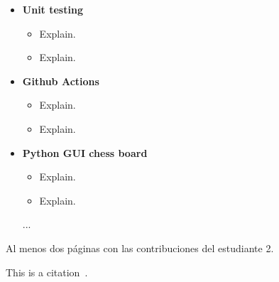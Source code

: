 \begin{itemize}
    \item \textbf{Unit testing}
    \begin{itemize}
        \item Explain.
        \item Explain.
    \end{itemize}
    
    \item \textbf{Github Actions}
    \begin{itemize}
        \item Explain.
        \item Explain.
    \end{itemize}

    \item \textbf{Python GUI chess board}
    \begin{itemize}
        \item Explain.
        \item Explain.
    \end{itemize}

    ...
\end{itemize}

Al menos dos páginas con las contribuciones del estudiante 2.

This is a citation~\cite{AtazLopezEmacs}.